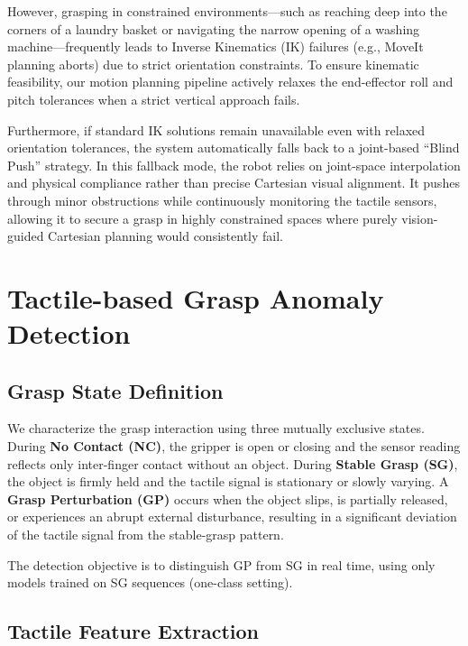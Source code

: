 \documentclass[pdflatex,sn-mathphys-num]{sn-jnl}%
\theoremstyle{thmstyleone}%
\theoremstyle{thmstyletwo}%
\theoremstyle{thmstylethree}%
\begin{document}
However, grasping in constrained environments—such as reaching deep into the corners of a laundry basket or navigating the narrow opening of a washing machine—frequently leads to Inverse Kinematics (IK) failures (e.g., MoveIt planning aborts) due to strict orientation constraints. To ensure kinematic feasibility, our motion planning pipeline actively relaxes the end-effector roll and pitch tolerances when a strict vertical approach fails.

Furthermore, if standard IK solutions remain unavailable even with relaxed orientation tolerances, the system automatically falls back to a joint-based ``Blind Push'' strategy. In this fallback mode, the robot relies on joint-space interpolation and physical compliance rather than precise Cartesian visual alignment. It pushes through minor obstructions while continuously monitoring the tactile sensors, allowing it to secure a grasp in highly constrained spaces where purely vision-guided Cartesian planning would consistently fail.

\section{Tactile-based Grasp Anomaly Detection}
\label{sec:anomaly}

\subsection{Grasp State Definition}
\label{sec:states}

We characterize the grasp interaction using three mutually exclusive states. During \textbf{No Contact (NC)}, the gripper is open or closing and the sensor reading reflects only inter-finger contact without an object. During \textbf{Stable Grasp (SG)}, the object is firmly held and the tactile signal is stationary or slowly varying. A \textbf{Grasp Perturbation (GP)} occurs when the object slips, is partially released, or experiences an abrupt external disturbance, resulting in a significant deviation of the tactile signal from the stable-grasp pattern.

The detection objective is to distinguish GP from SG in real time, using only models trained on SG sequences (one-class setting).

\subsection{Tactile Feature Extraction}
\label{sec:features}
\end{document}
